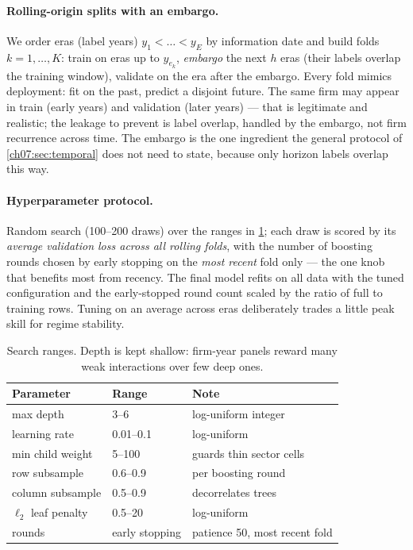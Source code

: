 \paragraph{Rolling-origin splits with an embargo.} We order eras (label years) $y_1 < \dots <
y_E$ by information date and build folds $k = 1, \dots, K$: train on eras up to $y_{e_k}$,
\emph{embargo} the next $h$ eras (their labels overlap the training window), validate on the era
after the embargo. Every fold mimics deployment: fit on the past, predict a disjoint future. The
same firm may appear in train (early years) and validation (later years) --- that is legitimate
and realistic; the leakage to prevent is label overlap, handled by the embargo, not firm
recurrence across time. The embargo is the one ingredient the general protocol of
\cref{ch07:sec:temporal} does not need to state, because only horizon labels overlap this way.

\paragraph{Hyperparameter protocol.} Random search (100--200 draws) over the ranges in
\cref{cheu:tab:hparams}; each draw is scored by its \emph{average validation loss across all
rolling folds}, with the number of boosting rounds chosen by early stopping on the \emph{most
recent} fold only --- the one knob that benefits most from recency. The final model refits
on all data with the tuned configuration and the early-stopped round count scaled by the ratio
of full to training rows. Tuning on an average across eras deliberately trades a little peak
skill for regime stability.

\begin{table}[htbp]
\centering
\caption{Search ranges. Depth is kept shallow: firm-year panels reward
many weak interactions over few deep ones.}
\label{cheu:tab:hparams}
\begin{tabular}{@{}lll@{}}
\toprule
Parameter & Range & Note \\
\midrule
max depth & 3--6 & log-uniform integer \\
learning rate & 0.01--0.1 & log-uniform \\
min child weight & 5--100 & guards thin sector cells \\
row subsample & 0.6--0.9 & per boosting round \\
column subsample & 0.5--0.9 & decorrelates trees \\
$\ell_2$ leaf penalty & 0.5--20 & log-uniform \\
rounds & early stopping & patience 50, most recent fold \\
\bottomrule
\end{tabular}
\end{table}

